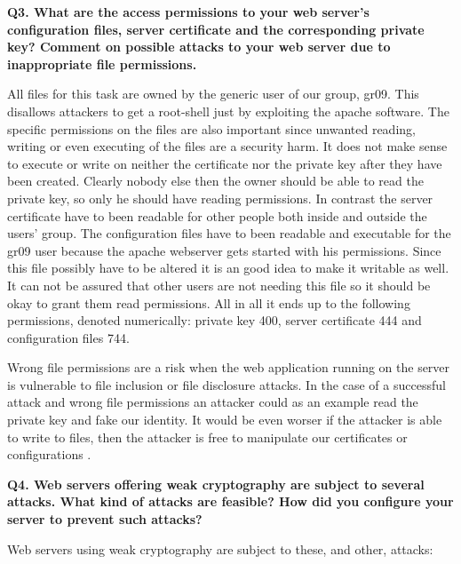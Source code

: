 \noindent
{\bf Q3. What are the access permissions to your web server’s configuration files,
server certificate and the corresponding private key? Comment on possible
attacks to your web server due to inappropriate file permissions.}
\newline

\noindent
All files for this task are owned by the generic user of our group, gr09. This disallows attackers to get a root-shell just by exploiting the apache software. The specific permissions on the files are also important since unwanted reading, writing or even executing of the files are a security harm. It does not make sense to execute or write on neither the certificate nor the private key after they have been created. Clearly nobody else then the owner should be able to read the private key, so only he should have reading permissions. In contrast the server certificate have to been readable for other people both inside and outside the users' group. The configuration files have to been readable and executable for the gr09 user because the apache webserver gets started with his permissions. Since this file possibly have to be altered it is an good idea to make it writable as well. 
It can not be assured that other users are not needing this file so it should be okay to grant them read permissions. All in all it ends up to the following permissions, denoted numerically: private key 400, server certificate 444 and configuration files 744. \cite {linuxsecurity} 
\newline

\noindent
Wrong file permissions are a risk when the web application running on the server is vulnerable to file inclusion or file disclosure attacks. In the case of a successful attack and wrong file permissions an attacker could as an example read the private key and fake our identity. It would be even worser if the attacker is able to write to files, then the attacker is free to manipulate our certificates or configurations \cite{InclDiscl}.
\newline


\noindent
{\bf Q4. Web servers offering weak cryptography are subject to several attacks.
What kind of attacks are feasible? How did you configure your server to prevent such attacks?}
\newline

\noindent
Web servers using weak cryptography are subject to these, and other, attacks:

